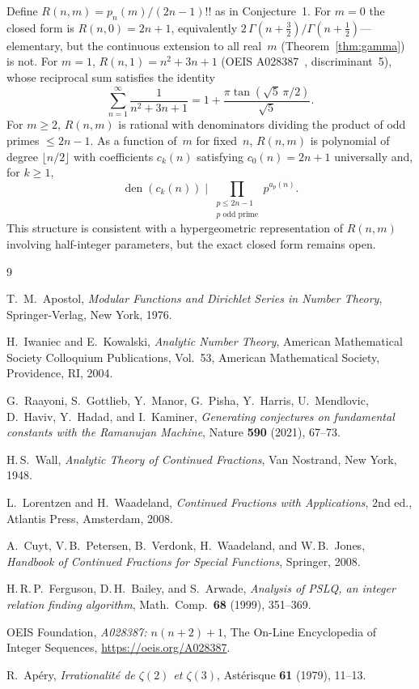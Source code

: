 \documentclass[11pt,a4paper]{article}
\theoremstyle{definition}
\theoremstyle{remark}
\begin{document}
Define $R(n,m) = p_n(m)/(2n{-}1)!!$ as in Conjecture~1.
For $m = 0$ the closed form is $R(n,0) = 2n+1$, equivalently
$2\,\Gamma(n{+}\tfrac{3}{2})/\Gamma(n{+}\tfrac{1}{2})$---elementary, but the
continuous extension to all real~$m$ (Theorem~\ref{thm:gamma}) is not.
For $m = 1$, $R(n,1) = n^2 + 3n + 1$ (OEIS A028387~\cite{oeis_A028387}, discriminant~5),
whose reciprocal sum satisfies the identity
\[
  \sum_{n=1}^{\infty} \frac{1}{n^2 + 3n + 1}
  = 1 + \frac{\pi \tan(\sqrt{5}\,\pi/2)}{\sqrt{5}}.
\]
For $m \ge 2$, $R(n,m)$ is rational with denominators dividing the product
of odd primes $\le 2n{-}1$. As a function of~$m$ for fixed~$n$, $R(n,m)$ is
polynomial of degree $\lfloor n/2 \rfloor$ with coefficients $c_k(n)$
satisfying $c_0(n) = 2n{+}1$ universally and, for $k \ge 1$,
\[
  \operatorname{den}(c_k(n)) \;\Big|\;
  \prod_{\substack{p \le 2n{-}1 \\ p \text{ odd prime}}} p^{a_p(n)}.
\]
This structure is consistent with a hypergeometric representation of $R(n,m)$
involving half-integer parameters, but the exact closed form remains open.

\begin{thebibliography}{9}

T.~M.~Apostol,
\textit{Modular Functions and Dirichlet Series in Number Theory},
Springer-Verlag, New York, 1976.

H.~Iwaniec and E.~Kowalski,
\textit{Analytic Number Theory},
American Mathematical Society Colloquium Publications, Vol.~53,
American Mathematical Society, Providence, RI, 2004.

G.~Raayoni, S.~Gottlieb, Y.~Manor, G.~Pisha, Y.~Harris, U.~Mendlovic,
D.~Haviv, Y.~Hadad, and I.~Kaminer,
\textit{Generating conjectures on fundamental constants with the Ramanujan Machine},
Nature \textbf{590} (2021), 67--73.

H.\,S.~Wall,
\textit{Analytic Theory of Continued Fractions},
Van Nostrand, New York, 1948.

L.~Lorentzen and H.~Waadeland,
\textit{Continued Fractions with Applications},
2nd ed., Atlantis Press, Amsterdam, 2008.

A.~Cuyt, V.\,B.~Petersen, B.~Verdonk, H.~Waadeland, and W.\,B.~Jones,
\textit{Handbook of Continued Fractions for Special Functions},
Springer, 2008.

H.\,R.\,P.~Ferguson, D.\,H.~Bailey, and S.~Arwade,
\textit{Analysis of PSLQ, an integer relation finding algorithm},
Math.\ Comp.\ \textbf{68} (1999), 351--369.

OEIS Foundation,
\textit{A028387: $n(n{+}2)+1$},
The On-Line Encyclopedia of Integer Sequences,
\url{https://oeis.org/A028387}.

R.~Ap\'ery,
\textit{Irrationalit\'e de $\zeta(2)$ et $\zeta(3)$},
Ast\'erisque \textbf{61} (1979), 11--13.

\end{thebibliography}
\end{document}

